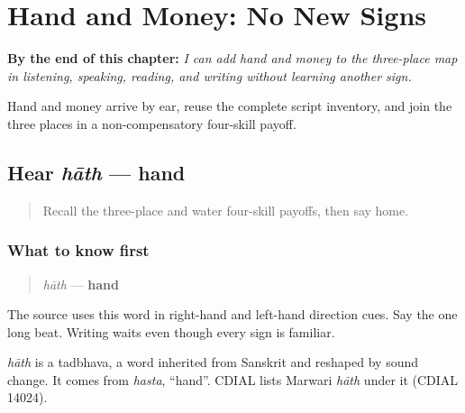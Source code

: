 
\chapter{Hand and Money: No New Signs}
\label{ch:mw-travel-five}

\begin{chapteropening}
\textbf{By the end of this chapter:} \emph{I can add hand and money to the three-place map in listening, speaking, reading, and writing without learning another sign.}

Hand and money arrive by ear, reuse the complete script inventory, and join the three places in a non-compensatory four-skill payoff.
\end{chapteropening}

\section[hāth]{Hear \emph{hāth} — hand}

\label{lesson:MW-C10-hear-haath}



\begin{quote}
Recall the three-place and water four-skill payoffs, then say home.
\end{quote}

\subsection*{What to know first}
\begin{quote}
\emph{hāth} — \textbf{hand}
\end{quote}

The source uses this word in right-hand and left-hand direction cues. Say the one long beat. Writing waits even though every sign is familiar.

\begin{cousinweb}
\emph{hāth} is a tadbhava, a word inherited from Sanskrit and reshaped by sound change. It comes from \emph{hasta}, \textquotedblleft{}hand\textquotedblright{}. CDIAL lists Marwari \emph{hāth} under it (CDIAL 14024).
\end{cousinweb}

